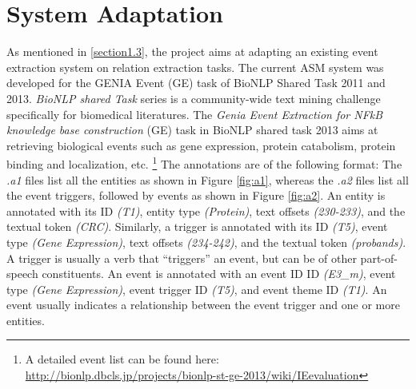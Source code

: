 \section{System Adaptation}
As mentioned in \ref{section1.3}, the project aims at adapting an existing event extraction system on relation extraction tasks. The current ASM system was developed for the GENIA Event (GE) task of BioNLP Shared Task 2011 and 2013.\newline\newline
\emph{BioNLP shared Task} series is a community-wide text mining challenge specifically for biomedical literatures. The \emph{Genia Event Extraction for NFkB knowledge base construction} (GE) task in BioNLP shared task 2013 aims at retrieving biological events such as gene expression, protein catabolism, protein binding and localization, etc. \footnote{A detailed event list can be found here: \href{http://bionlp.dbcls.jp/projects/bionlp-st-ge-2013/wiki/IEevaluation}{http://bionlp.dbcls.jp/projects/bionlp-st-ge-2013/wiki/IEevaluation}}
The annotations are of the following format: The \emph{.a1} files list all the entities as shown in Figure \ref{fig:a1}, whereas the \emph{.a2} files list all the event triggers, followed by events as shown in Figure \ref{fig:a2}. An entity is annotated with its ID \emph{(T1)}, entity type \emph{(Protein)}, text offsets \emph{(230-233)}, and the textual token \emph{(CRC)}. Similarly, a trigger is annotated with its ID \emph{(T5)}, event type \emph{(Gene Expression)}, text offsets \emph{(234-242)}, and the textual token \emph{(probands)}. A trigger is usually a verb that ``triggers'' an event, but can be of other part-of-speech constituents. An event is annotated with an event ID ID \emph{(E3\_m)}, event type \emph{(Gene Expression)}, event trigger ID \emph{(T5)}, and event theme ID \emph{(T1)}. An event usually indicates a relationship between the event trigger and one or more entities.\newline\newline
